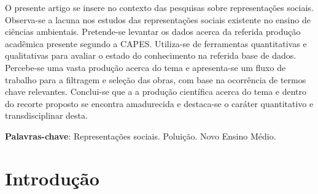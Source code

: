 \documentclass[
   article,       %
   11pt,          %
   oneside,       %
   a4paper,       %
   english,       %
   brazil,           %
   sumario=tradicional
   ]{abntex2}
\begin{document}

\frenchspacing 


%
%

\maketitle





\begin{resumoumacoluna}
   O presente artigo se insere no contexto das pesquisas sobre representações sociais.
   Observa-se a lacuna nos estudos das representações sociais existente no ensino de ciências ambientais.
   Pretende-se levantar os dados acerca da referida produção acadêmica presente segundo a CAPES.
   Utiliza-se de ferramentas quantitativas e qualitativas para avaliar o estado do conhecimento na referida base de dados.
   Percebe-se uma vasta produção acerca do tema e apresenta-se um fluxo de trabalho para a filtragem e seleção das obras, com base na ocorrência de termos chave relevantes.
   Conclui-se que a a produção científica acerca do tema e dentro do recorte proposto se encontra amadurecida e destaca-se o caráter quantitativo e transdisciplinar desta. 

 \vspace{\onelineskip}
 
 \noindent
 \textbf{Palavras-chave}: Representações sociais. Poluição. Novo Ensino Médio.
\end{resumoumacoluna}


\textual

\section{Introdução}
\end{document}
